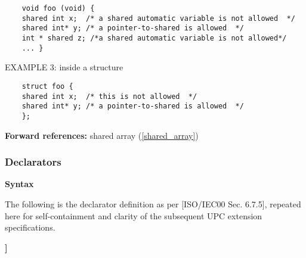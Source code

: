 \begin{verbatim}
    void foo (void) { 
    shared int x;  /* a shared automatic variable is not allowed  */ 
    shared int* y; /* a pointer-to-shared is allowed  */ 
    int * shared z; /*a shared automatic variable is not allowed*/ 
    ... } 
\end{verbatim}

\np EXAMPLE 3: inside a structure  

\begin{verbatim}
    struct foo { 
    shared int x;  /* this is not allowed  */ 
    shared int* y; /* a pointer-to-shared is allowed  */ 
    }; 
\end{verbatim}

{\bf Forward references:} shared array (\ref{shared_array})
\subsubsection{Declarators}
\label{declarator}

{\bf Syntax} 

\npf The following is the declarator definition as per
    [ISO/IEC00 Sec. 6.7.5], repeated here for self-containment and
    clarity of the subsequent UPC extension specifications.




\hspace{3em}{\em identifier }

\hspace{3em}{\em ( declarator )}




\hspace{3em}{\em direct-declarator {\bf [} type-qualifier-list$_{opt}$ }
                 {\bf * ]}

